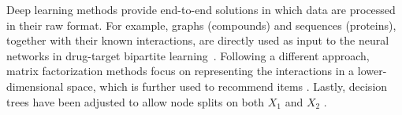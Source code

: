 \documentclass[sn-mathphys-num]{sn-jnl}%
\theoremstyle{thmstyleone}%
\theoremstyle{thmstyletwo}%
\theoremstyle{thmstylethree}%
\begin{document}
%
Deep learning methods provide end-to-end solutions in which data are processed in their raw format. For example, graphs (compounds) and sequences (proteins), together with their known interactions, are directly used as input to the neural networks in drug-target bipartite learning~\cite{lin2023comprehensive,bagherian2021machine,liu2024ssldti}. Following a different approach,  matrix factorization methods focus on representing the interactions in a lower-dimensional space, which is further used to recommend items \cite{guo2024rise,chen2022review}.
Lastly, decision trees have been adjusted to allow node splits on both $X_1$ and $X_2$ \cite{pliakos_global_2018,pliakos_integrating_2019,pliakos_network_2019}.
\end{document}
